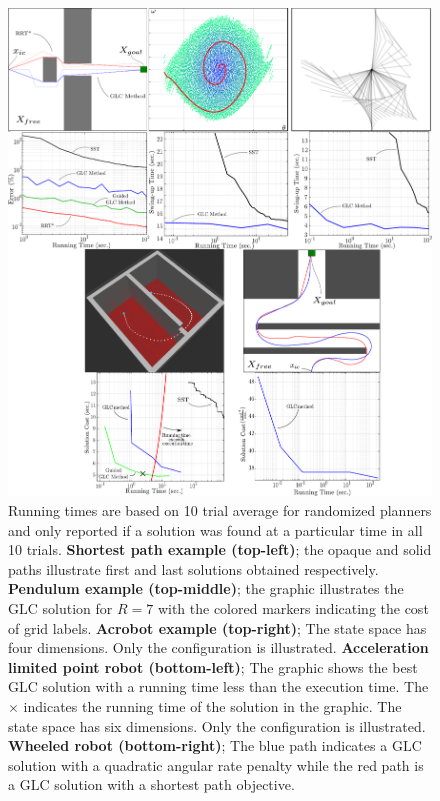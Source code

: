 \documentclass{llncs}
\newcommand{\GLC}{\ensuremath{\mathrm{GLC}}\xspace}
\begin{document}
\begin{figure}
	\centering{}\includegraphics[width=1\textwidth]{Graphics/demos}\caption{\label{fig:bench} Running times are based on 10 trial average for randomized planners and only reported if a solution was found at a particular time in all 10 trials. {\bf Shortest path example (top-left)}; the opaque and solid paths illustrate first and last solutions obtained respectively. {\bf Pendulum example (top-middle)}; the graphic illustrates the \GLC solution for $R=7$ with the colored markers indicating the cost of grid labels. {\bf Acrobot example (top-right)}; The state space has four dimensions. Only the configuration is illustrated. {\bf Acceleration limited point robot (bottom-left)}; The graphic shows the best \GLC solution with a running time less than the execution time. The $\times$ indicates the running time of the solution in the graphic. The state space has six dimensions. Only the configuration is illustrated. {\bf Wheeled robot (bottom-right)}; The blue path indicates a \GLC solution with a quadratic angular rate penalty while the red path is a \GLC solution with a shortest path objective.}
\end{figure}
\end{document}
